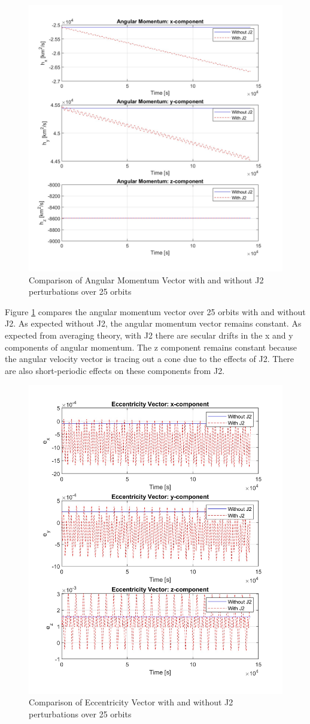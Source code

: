 \begin{figure}[H]
    \centering
    \includegraphics[width=0.5\linewidth]{PS1/Figures/h_J2_comparison.jpg}
    \caption{Comparison of Angular Momentum Vector with and without J2 perturbations over 25 orbits}
    \label{fig:angular_momentum}
\end{figure}

Figure \ref{fig:angular_momentum} compares the angular momentum vector over 25 orbits with and without J2. As expected without J2, the angular momentum vector remains constant. As expected from averaging theory, with J2 there are secular drifts in the x and y components of angular momentum. The z component remains constant because the angular velocity vector is tracing out a cone due to the effects of J2. There are also short-periodic effects on these components from J2.  

\begin{figure}[H]
    \centering
    \includegraphics[width=0.5\linewidth]{PS1/Figures/ecc_J2_comparison.jpg}
    \caption{Comparison of Eccentricity Vector with and without J2 perturbations over 25 orbits}
    \label{fig:eccentricity_vector}
\end{figure}

